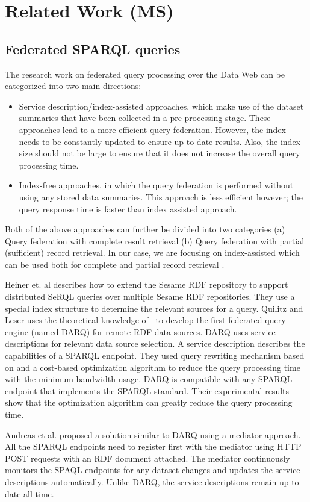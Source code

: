 \documentclass{sig-alternate}  %
\begin{document}
\section{Related Work (MS)}
\subsection{Federated SPARQL queries}
The research work on federated query processing over the Data Web
can be categorized into two main directions: 
\begin{itemize}
\item Service description/index-assisted approaches, which make use of the
dataset summaries that have been collected in a pre-processing stage.
These approaches lead to a more efficient query federation. However,
the index needs to be constantly updated to ensure up-to-date results.
Also, the index size should not be large to ensure that it does not
increase the overall query processing time. 
\item Index-free approaches, in which the query federation is performed
without using any stored data summaries. This approach is less efficient
however; the query response time is faster than index assisted approach. 
\end{itemize}
Both of the above approaches can further be divided into two categories
(a) Query federation with complete result retrieval (b) Query federation
with partial (sufficient) record retrieval. In our case, we are focusing
on index-assisted which can be used both for complete and partial record retrieval .

Heiner et. al\cite{key-1} describes how to extend the Sesame RDF
repository to support distributed SeRQL queries over multiple Sesame
RDF repositories. They use a special index structure to determine
the relevant sources for a query. Quilitz and Leser\cite{key-2}
uses the theoretical knowledge of~\cite{key-1} to develop the first federated
query engine (named DARQ) for remote RDF data sources. DARQ uses service
descriptions for relevant data source selection. A service description
describes the capabilities of a SPARQL endpoint. They used query rewriting
mechanism based on\cite{key-8} and a cost-based optimization algorithm
to reduce the query processing time with the minimum bandwidth usage.
DARQ is compatible with any SPARQL endpoint that implements the SPARQL
standard. Their experimental results show that the optimization algorithm
can greatly reduce the query processing time.

Andreas et al.\cite{key-3} proposed a solution similar to DARQ using a
mediator approach. All the SPARQL endpoints need to register first
with the mediator using HTTP POST requests with an RDF document attached.
The mediator continuously monitors the SPAQL endpoints for any dataset
changes and updates the service descriptions automatically. Unlike
DARQ, the service descriptions remain up-to-date all time. 
\end{document}
